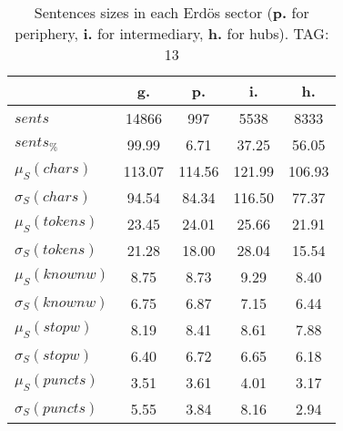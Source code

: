 \begin{table}[h!]
\begin{center}
\begin{tabular}{| l | c | c | c | c |}\hline
 & g. & p. & i. & h. \\\hline
$sents$ & 14866  & 997  & 5538  & 8333 \\\hline
$sents_{\%}$ & 99.99  & 6.71  & 37.25  & 56.05 \\\hline
$\mu_S(chars)$ & 113.07  & 114.56  & 121.99  & 106.93 \\\hline
$\sigma_S(chars)$ & 94.54  & 84.34  & 116.50  & 77.37 \\\hline
$\mu_S(tokens)$ & 23.45  & 24.01  & 25.66  & 21.91 \\\hline
$\sigma_S(tokens)$ & 21.28  & 18.00  & 28.04  & 15.54 \\\hline
$\mu_S(knownw)$ & 8.75  & 8.73  & 9.29  & 8.40 \\\hline
$\sigma_S(knownw)$ & 6.75  & 6.87  & 7.15  & 6.44 \\\hline
$\mu_S(stopw)$ & 8.19  & 8.41  & 8.61  & 7.88 \\\hline
$\sigma_S(stopw)$ & 6.40  & 6.72  & 6.65  & 6.18 \\\hline
$\mu_S(puncts)$ & 3.51  & 3.61  & 4.01  & 3.17 \\\hline
$\sigma_S(puncts)$ & 5.55  & 3.84  & 8.16  & 2.94 \\\hline
\end{tabular}
\caption{Sentences sizes in each Erd\"os sector ({{\bf p.}} for periphery, {{\bf i.}} for intermediary, {{\bf h.}} for hubs). TAG: 13}
\end{center}
\end{table}